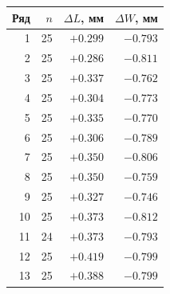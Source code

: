 \begin{tabular}{@{}rrrr@{}}
\toprule
Ряд & $n$ & $\Delta L$, мм & $\Delta W$, мм \\
\midrule
1 & 25 & $+\num{0.299}$ & $-\num{0.793}$ \\
2 & 25 & $+\num{0.286}$ & $-\num{0.811}$ \\
3 & 25 & $+\num{0.337}$ & $-\num{0.762}$ \\
4 & 25 & $+\num{0.304}$ & $-\num{0.773}$ \\
5 & 25 & $+\num{0.335}$ & $-\num{0.770}$ \\
6 & 25 & $+\num{0.306}$ & $-\num{0.789}$ \\
7 & 25 & $+\num{0.350}$ & $-\num{0.806}$ \\
8 & 25 & $+\num{0.350}$ & $-\num{0.759}$ \\
9 & 25 & $+\num{0.327}$ & $-\num{0.746}$ \\
10 & 25 & $+\num{0.373}$ & $-\num{0.812}$ \\
11 & 24 & $+\num{0.373}$ & $-\num{0.793}$ \\
12 & 25 & $+\num{0.419}$ & $-\num{0.799}$ \\
13 & 25 & $+\num{0.388}$ & $-\num{0.799}$ \\
\bottomrule
\end{tabular}
